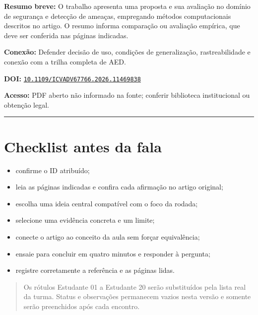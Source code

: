 \documentclass[10pt,a4paper]{article}
\newenvironment{AccessBox}{\par\smallskip\begin{quote}\small}{\end{quote}\par\smallskip}
\begin{document}
\textbf{Resumo breve:} O trabalho apresenta uma proposta e sua avaliação no domínio de segurança e detecção de ameaças, empregando métodos computacionais descritos no artigo. O resumo informa comparação ou avaliação empírica, que deve ser conferida nas páginas indicadas.\par
\textbf{Conexão:} Defender decisão de uso, condições de generalização, rastreabilidade e conexão com a trilha completa de AED.\par
\textbf{DOI:} \href{https://doi.org/10.1109/ICVADV67766.2026.11469838}{\nolinkurl{10.1109/ICVADV67766.2026.11469838}}\par
\textbf{Acesso:} PDF aberto não informado na fonte; conferir biblioteca institucional ou obtenção legal.\par
\noindent\rule{\textwidth}{0.35pt}
\clearpage
\section*{Checklist antes da fala}
\begin{itemize}
\item confirme o ID atribuído;
\item leia as páginas indicadas e confira cada afirmação no artigo original;
\item escolha uma ideia central compatível com o foco da rodada;
\item selecione uma evidência concreta e um limite;
\item conecte o artigo ao conceito da aula sem forçar equivalência;
\item ensaie para concluir em quatro minutos e responder à pergunta;
\item registre corretamente a referência e as páginas lidas.
\end{itemize}
\begin{AccessBox}
Os rótulos Estudante 01 a Estudante 20 serão substituídos pela lista real da turma. Status e observações permanecem vazios nesta versão e somente serão preenchidos após cada encontro.
\end{AccessBox}
\end{document}
